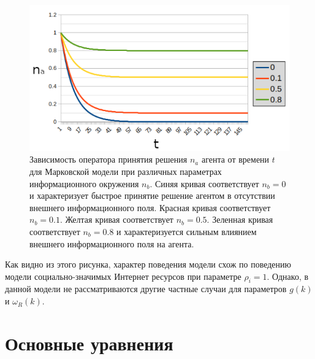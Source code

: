 \begin{figure}[h!]
    \centering
    \captionsetup{justification=centering}
    \includegraphics[width=0.9\linewidth]{pictures/at_baga.png}
    \caption{Зависимость оператора принятия решения $n_{a}$ агента от времени $t$ для Марковской
    модели при различных параметрах информационного окружения $n_{b}$. Синяя кривая соответствует
    $n_{b} = 0$ и характеризует быстрое принятие решение агентом в отсутствии внешнего информационного
    поля. Красная кривая соответствует $n_{b} = 0.1$. Желтая кривая соответствует $n_{b} = 0.5$.
    Зеленная кривая соответствует $n_{b} = 0.8$ и характеризуется сильным влиянием внешнего информационного
    поля на агента.}
    \label{fig:at_baga}
\end{figure}

Как видно из этого рисунка, характер поведения модели схож по поведению модели социально-значимых
Интернет ресурсов при параметре $\rho_{i} = 1$.
Однако, в данной модели не рассматриваются другие частные случаи для параметров $g(k)$ и $\omega_{R}(k)$.

\section{Основные уравнения}

